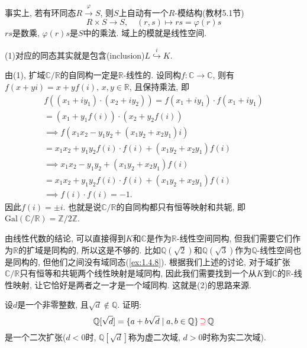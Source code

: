 \begin{remark}
    事实上, 若有环同态$R \overset{\varphi}\to S$, 则$S$上自动有一个$R$-模结构(教材5.1节)
    \[
        R \times S \to S, \quad (r, s) \mapsto rs = \varphi(r)s
    \]
    $rs$是数乘, $\varphi(r)s$是$S$中的乘法. 域上的模就是线性空间.
    
    (1)对应的同态其实就是包含(inclusion)$L \overset{i}\hookrightarrow K$.

    由(1), 扩域$\mathbb{C}/\mathbb{R}$的自同构一定是$\mathbb{R}$-线性的. 设同构$f: \mathbb{C} \to \mathbb{C}$, 则有$f(x + yi) = x + yf(i),\, x, y \in \mathbb{R}$, 且保持乘法, 即
    \[
    \begin{gathered}
        f\left((x_1 + iy_1) \cdot (x_2 + iy_2)\right) = f(x_1 + iy_1) \cdot f(x_1 + iy_1)\\
        = (x_1 + y_1f(i)) \cdot (x_2 + y_2f(i))\\
        \implies f\left(x_1x_2 - y_1y_2 + (x_1y_2 +x_2y_1)i\right)\\
        = x_1x_2 + y_1y_2f(i) \cdot f(i) + (x_1y_2 +x_2y_1)f(i)\\
        \implies x_1x_2 - y_1y_2 + (x_1y_2 +x_2y_1)f(i)\\
        = x_1x_2 + y_1y_2f(i) \cdot f(i) + (x_1y_2 +x_2y_1)f(i)\\
        \implies f(i) \cdot f(i) = -1.
        \end{gathered}
    \]
    因此$f(i) = \pm i$. 也就是说$\mathbb{C}/\mathbb{R}$的自同构都只有恒等映射和共轭, 即$\mathrm{Gal}(\mathbb{C}/\mathbb{R}) = \mathbb{Z}/2\mathbb{Z}$.
        
    由线性代数的结论, 可以直接得到$K$和$\mathbb{C}$是作为$\mathbb{R}$-线性空间同构, 但我们需要它们作为$\mathbb{R}$的扩域是同构的, 所以这是不够的. 比如$\mathbb{Q}(\sqrt{2})$和$\mathbb{Q}(\sqrt{3})$作为$\mathbb{Q}$-线性空间也是同构的, 但他们之间没有域同态(\ref{ex:1.4.8}). 根据我们上述的讨论, 对于域扩张$\mathbb{C}/\mathbb{R}$只有恒等和共轭两个线性映射是域同构, 因此我们需要找到一个从$K$到$\mathbb{C}$的$\mathbb{R}$-线性映射, 让它恰好是两者之一才是一个域同构. 这就是(2)的思路来源.
\end{remark}

\begin{problem}
    设$d$是一个非零整数, 且$\sqrt d \notin \mathbb{Q}$. 证明:
    \[
        \mathbb{Q}[\sqrt{d}] = \{a + b\sqrt{d} \mid a, b \in \mathbb{Q}\} \,\textcolor{red}{\supseteq}\, \mathbb{Q}
    \]
    是一个二次扩张($d < 0$时, $\mathbb{Q}[\sqrt{d}]$称为虚二次域, $d > 0$时称为实二次域).
\end{problem}

